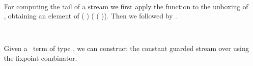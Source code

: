 \begin{code}%
\>[0]\AgdaSpace{}%
\AgdaSymbol{:}\AgdaSpace{}%
\AgdaSymbol{\{}\AgdaSpace{}%
\AgdaSymbol{:}\AgdaSpace{}%
\AgdaSpace{}%
\AgdaSymbol{\}}\AgdaSpace{}%
\AgdaSymbol{\{}\AgdaSpace{}%
\AgdaSymbol{:}\AgdaSpace{}%
\AgdaSpace{}%
\AgdaSymbol{\}}\AgdaSpace{}%
\AgdaSpace{}%
\AgdaSpace{}%
\AgdaSpace{}%
\AgdaSymbol{(}\AgdaSpace{}%
\AgdaSymbol{)}\AgdaSpace{}%
\AgdaSpace{}%
\AgdaSpace{}%
\AgdaSpace{}%
\<%
\\
\>[0]\AgdaSpace{}%
\AgdaSpace{}%
\AgdaSymbol{=}\AgdaSpace{}%
\AgdaSpace{}%
\AgdaSymbol{(}\AgdaSpace{}%
\AgdaSymbol{)}\<%
\end{code}
For computing the tail of a stream  we first apply the function  to the unboxing of , obtaining an element of  ( ) ( ( )). Then we  followed by .
\begin{code}%
\>[0]\AgdaSpace{}%
\AgdaSymbol{:}\AgdaSpace{}%
\AgdaSymbol{\{}\AgdaSpace{}%
\AgdaSymbol{:}\AgdaSpace{}%
\AgdaSpace{}%
\AgdaSymbol{\}}\AgdaSpace{}%
\AgdaSymbol{\{}\AgdaSpace{}%
\AgdaSymbol{:}\AgdaSpace{}%
\AgdaSpace{}%
\AgdaSymbol{\}}\AgdaSpace{}%
\AgdaSpace{}%
\AgdaSpace{}%
\AgdaSpace{}%
\AgdaSymbol{(}\AgdaSpace{}%
\AgdaSymbol{)}\AgdaSpace{}%
\AgdaSpace{}%
\AgdaSpace{}%
\AgdaSpace{}%
\AgdaSymbol{(}\AgdaSpace{}%
\AgdaSymbol{)}\<%
\\
\>[0]\AgdaSpace{}%
\AgdaSpace{}%
\AgdaSymbol{=}\AgdaSpace{}%
\AgdaSpace{}%
\AgdaSymbol{(}\AgdaSpace{}%
\AgdaSymbol{(}\AgdaSpace{}%
\AgdaSymbol{(}\AgdaSpace{}%
\AgdaSymbol{)))}\<%
\end{code}
Given a \GTT\ term  of type , we can construct the constant guarded stream over  using the fixpoint combinator.
